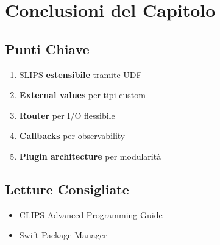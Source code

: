 \section{Conclusioni del Capitolo}

\subsection{Punti Chiave}

\begin{enumerate}
\item SLIPS \textbf{estensibile} tramite UDF
\item \textbf{External values} per tipi custom
\item \textbf{Router} per I/O flessibile
\item \textbf{Callbacks} per observability
\item \textbf{Plugin architecture} per modularità
\end{enumerate}

\subsection{Letture Consigliate}

\begin{itemize}
\item CLIPS Advanced Programming Guide
\item Swift Package Manager
\end{itemize}
